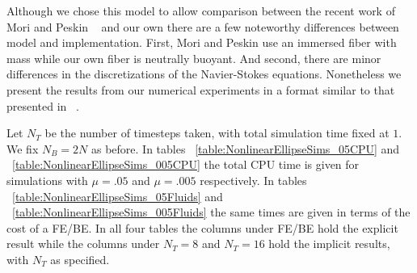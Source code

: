 \documentclass[preprint,12pt]{elsarticle}
\begin{document}
Although we chose this model to allow comparison between the recent work of Mori and Peskin ~\cite{MP2008} and our own there are a few noteworthy differences between model and implementation. First, Mori and Peskin use an immersed fiber with mass while our own fiber is neutrally buoyant. And second, there are minor differences in the discretizations of the Navier-Stokes equations. Nonetheless we present the results from our numerical experiments in a format similar to that presented in ~\cite{MP2008}.

Let $N_T$ be the number of timesteps taken, with total simulation time fixed at $1$. We fix $N_B=2N$ as before. 
In tables ~\ref{table:NonlinearEllipseSims_05CPU} and ~\ref{table:NonlinearEllipseSims_005CPU} the total CPU time is given for simulations with $\mu=.05$ and $\mu=.005$ respectively. In tables ~\ref{table:NonlinearEllipseSims_05Fluids} and ~\ref{table:NonlinearEllipseSims_005Fluids} the same times are given in terms of the cost of a FE/BE. In all four tables the columns under FE/BE hold the explicit result while the columns under $N_T=8$ and $N_T=16$ hold the implicit results, with $N_T$ as specified.
\end{document}
